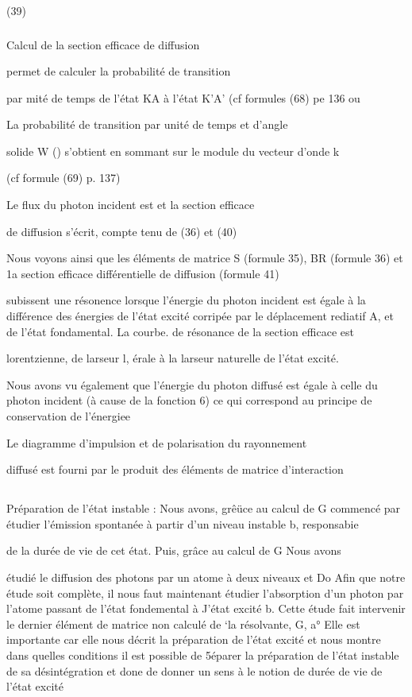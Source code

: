 (39)

\subsubsection{} Calcul de la section efficace de diffusion%

 permet de calculer la probabilité de transition

par mité de temps de l'état KA à l'état K'A' (cf formules (68) pe 136 ou

La probabilité de transition par unité de temps et d'angle

solide W () s'obtient en sommant sur le module du vecteur d'onde k

(cf formule (69) p. 137)

Le flux du photon incident est et la section efficace

de diffusion s'écrit, compte tenu de (36) et (40)

Nous voyons ainsi que les éléments de matrice S (formule 35),
BR (formule 36) et 1a section efficace différentielle de diffusion (formule 41)

subissent une résonence lorsque l'énergie du photon incident est égale à la
différence des énergies de l'état excité corripée par le déplacement rediatif
A, et de l'état fondamental. La courbe. de résonance de la section efficace est

lorentzienne, de larseur l, érale à la larseur naturelle de l'état excité.

Nous avons vu également que l'énergie du photon diffusé est
égale à celle du photon incident (à cause de la fonction 6) ce qui correspond au principe de conservation de l'énergiee

Le diagramme d'impulsion et de polarisation du rayonnement

diffusé est fourni par le produit des éléments de matrice d'interaction

\subsection{} Préparation de l'état instable :%
Nous avons, grêüce au calcul de G  commencé
par étudier l'émission spontanée à partir d'un niveau instable b, responsabie

de la durée de vie de cet état. Puis, grâce au calcul de G Nous avons

étudié le diffusion des photons par un atome à deux niveaux  et Do Afin que
notre étude soit complète, il nous faut maintenant étudier l'absorption d'un
photon par l'atome passant de l'état fondemental à J'état excité b. Cette
étude fait intervenir le dernier élément de matrice non calculé de ‘la résolvante, G, a° Elle est importante car elle nous décrit la préparation de
l'état excité et nous montre dans quelles conditions il est possible de 5éparer la préparation de l'état instable de sa désintégration et done de donner
un sens à le notion de durée de vie de l'état excité

